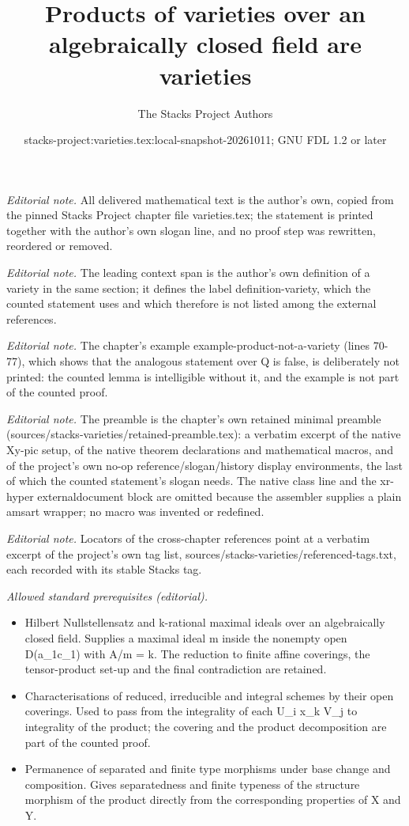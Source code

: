 \documentclass[10pt,a4paper]{amsart}
\title{Products of varieties over an algebraically closed field are varieties}
\author{The Stacks Project Authors}
\date{stacks-project:varieties.tex:local-snapshot-20261011; GNU FDL 1.2 or later}
\theoremstyle{plain}
\theoremstyle{definition}
\theoremstyle{remark}
\numberwithin{equation}{subsection}
\begin{document}
\maketitle
\noindent\textit{Editorial note.} All delivered mathematical text is the author's own, copied from the pinned Stacks Project chapter file varieties.tex; the statement is printed together with the author's own slogan line, and no proof step was rewritten, reordered or removed.\par\medskip
\noindent\textit{Editorial note.} The leading context span is the author's own definition of a variety in the same section; it defines the label definition-variety, which the counted statement uses and which therefore is not listed among the external references.\par\medskip
\noindent\textit{Editorial note.} The chapter's example example-product-not-a-variety (lines 70-77), which shows that the analogous statement over Q is false, is deliberately not printed: the counted lemma is intelligible without it, and the example is not part of the counted proof.\par\medskip
\noindent\textit{Editorial note.} The preamble is the chapter's own retained minimal preamble (sources/stacks-varieties/retained-preamble.tex): a verbatim excerpt of the native Xy-pic setup, of the native theorem declarations and mathematical macros, and of the project's own no-op reference/slogan/history display environments, the last of which the counted statement's slogan needs. The native class line and the xr-hyper externaldocument block are omitted because the assembler supplies a plain amsart wrapper; no macro was invented or redefined.\par\medskip
\noindent\textit{Editorial note.} Locators of the cross-chapter references point at a verbatim excerpt of the project's own tag list, sources/stacks-varieties/referenced-tags.txt, each recorded with its stable Stacks tag.\par\medskip
\noindent\textit{Allowed standard prerequisites (editorial).}\begin{itemize}
\item Hilbert Nullstellensatz and k-rational maximal ideals over an algebraically closed field. Supplies a maximal ideal m inside the nonempty open D(a\_1c\_1) with A/m = k. The reduction to finite affine coverings, the tensor-product set-up and the final contradiction are retained.
\item Characterisations of reduced, irreducible and integral schemes by their open coverings. Used to pass from the integrality of each U\_i x\_k V\_j to integrality of the product; the covering and the product decomposition are part of the counted proof.
\item Permanence of separated and finite type morphisms under base change and composition. Gives separatedness and finite typeness of the structure morphism of the product directly from the corresponding properties of X and Y.
\end{itemize}\medskip
\end{document}
